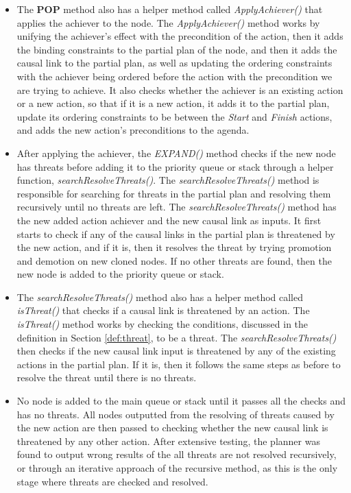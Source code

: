 \begin{itemize}
\begin{itemize}
              \item The \textbf{POP} method also has a helper method called \textit{ApplyAchiever()} that applies the achiever to the node. The \textit{ApplyAchiever()} method works by unifying the achiever's effect with the precondition of the action, then it adds the binding constraints to the partial plan of the node, and then it adds the causal link to the partial plan, as well as updating the ordering constraints with the achiever being ordered before the action with the precondition we are trying to achieve. It also checks whether the achiever is an existing action or a new action, so that if it is a new action, it adds it to the partial plan, update its ordering constraints to be between the \textit{Start} and \textit{Finish} actions, and adds the new action's preconditions to the agenda.

              \item After applying the achiever, the \textit{EXPAND()} method checks if the new node has threats before adding it to the priority queue or stack through a helper function, \textit{searchResolveThreats()}. The \textit{searchResolveThreats()} method is responsible for searching for threats in the partial plan and resolving them recursively until no threats are left. The \textit{searchResolveThreats()} method has the new added action achiever and the new causal link as inputs. It first starts to check if any of the causal links in the partial plan is threatened by the new action, and if it is, then it resolves the threat by trying promotion and demotion on new cloned nodes. If no other threats are found, then the new node is added to the priority queue or stack.

              \item The \textit{searchResolveThreats()} method also has a helper method called \textit{isThreat()} that checks if a causal link is threatened by an action. The \textit{isThreat()} method works by checking the conditions, discussed in the definition in Section \ref{def:threat}, to be a threat. The \textit{searchResolveThreats()} then checks if the new causal link input is threatened by any of the existing actions in the partial plan. If it is, then it follows the same steps as before to resolve the threat until there is no threats.

              \item No node is added to the main queue or stack until it passes all the checks and has no threats. All nodes outputted from the resolving of threats caused by the new action are then passed to checking whether the new causal link is threatened by any other action. After extensive testing, the planner was found to output wrong results of the all threats are not resolved recursively, or through an iterative approach of the recursive method, as this is the only stage where threats are checked and resolved.
          \end{itemize}


\end{itemize}
